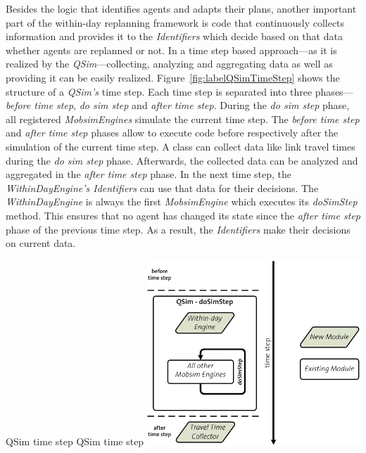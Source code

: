 Besides the logic that identifies agents and adapts their plans, another important part of the within-day replanning framework is code that continuously collects information and provides it to the \emph{Identifiers} which decide based on that data whether agents are replanned or not. In a time step based approach---as it is realized by the \emph{QSim}---collecting, analyzing and aggregating data as well as providing it can be easily realized. Figure~\ref{fig:labelQSimTimeStep} shows the structure of a \emph{QSim's} time step. Each time step is separated into three phases---\emph{before time step}, \emph{do sim step} and \emph{after time step}. During the \emph{do sim step} phase, all registered \emph{MobsimEngines} simulate the current time step. The \emph{before time step} and \emph{after time step} phases allow to execute code before respectively after the simulation of the current time step. A class can collect data like link travel times during the \emph{do sim step} phase. Afterwards, the collected data can be analyzed and aggregated in the \emph{after time step} phase. In the next time step, the \emph{WithinDayEngine's Identifiers} can use that data for their decisions. The \emph{WithinDayEngine} is always the first \emph{MobsimEngine} which executes its \emph{doSimStep} method. This ensures that no agent has changed its state since the \emph{after time step} phase of the previous time step. As a result, the \emph{Identifiers} make their decisions on %
current data.

\createfigure%
{QSim time step}%
{QSim time step}%
{\label{fig:labelQSimTimeStep}}%
{\includegraphics[width=8.0cm, angle=0]{extending/figures/WithinDayReplanning/QSimTimeStep}}%
{}


